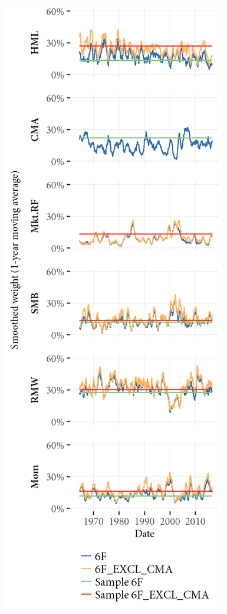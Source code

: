 \begin{figure}[htbp]
  \includegraphics[scale = 1]{graphics/Weights_6F_EXCL_CMA_6F.png}
\end{figure}

